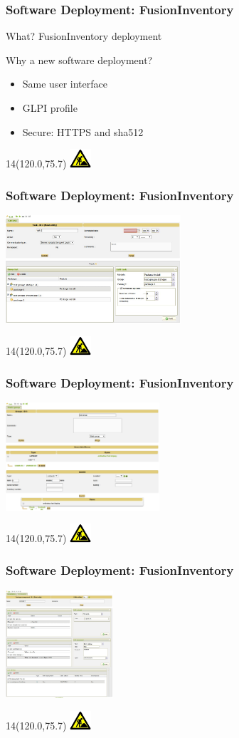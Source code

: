 \documentclass{beamer}
\newcommand{\WorkInProgress}{%
\begin{textblock}{14}(120.0,75.7)
\includegraphics[height=0.7cm]{./pics/workinprogress.jpg}
\end{textblock}
  }
\begin{document}
\begin{frame}
    \frametitle{Software Deployment: FusionInventory}

    \begin{block}{What?}
    FusionInventory deployment
    \end{block}

    \begin{block}{Why a new software deployment?}
    \begin{itemize}
        \item Same user interface
        \item GLPI profile
        \item Secure: HTTPS and sha512
    \end{itemize}
    \end{block}

\WorkInProgress
\end{frame}


\begin{frame}
    \frametitle{Software Deployment: FusionInventory}

    \includegraphics[height=4.0cm]{pics/tasks.jpg}

\WorkInProgress
\end{frame}


\begin{frame}
    \frametitle{Software Deployment: FusionInventory}

    \includegraphics[height=4.0cm]{pics/groups.jpg}

\WorkInProgress
\end{frame}

\begin{frame}
    \frametitle{Software Deployment: FusionInventory}

    \includegraphics[height=4.0cm]{pics/packages.jpg}

\WorkInProgress
\end{frame}
\end{document}
